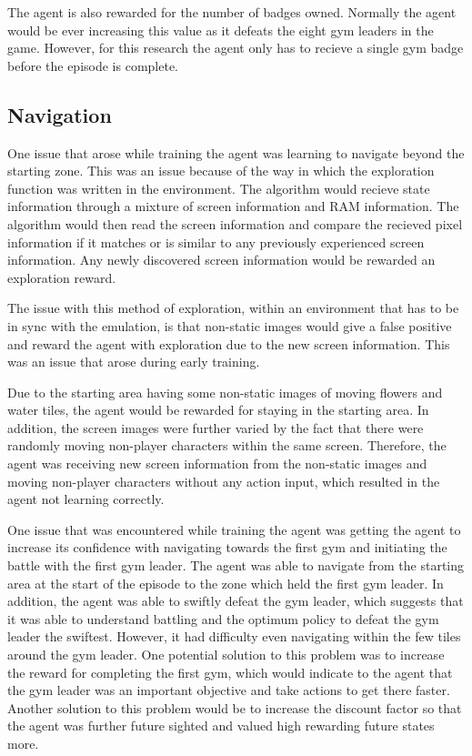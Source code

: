 The agent is also rewarded for the number of badges owned. Normally the agent would be ever increasing this value as it defeats the eight gym leaders in the game. However, for this research the agent only has to recieve a single gym badge before the episode is complete.

\subsection{Navigation}

One issue that arose while training the agent was learning to navigate beyond the starting zone. This was an issue because of the way in which the exploration function was written in the environment. The algorithm would recieve state information through a mixture of screen information and RAM information. The algorithm would then read the screen information and compare the recieved pixel information if it matches or is similar to any previously experienced screen information. Any newly discovered screen information would be rewarded an exploration reward. 

The issue with this method of exploration, within an environment that has to be in sync with the emulation, is that non-static images would give a false positive and reward the agent with exploration due to the new screen information. This was an issue that arose during early training. 

Due to the starting area having some non-static images of moving flowers and water tiles, the agent would be rewarded for staying in the starting area. In addition, the screen images were further varied by the fact that there were randomly moving non-player characters within the same screen. Therefore, the agent was receiving new screen information from the non-static images and moving non-player characters without any action input, which resulted in the agent not learning correctly.

One issue that was encountered while training the agent was getting the agent to increase its confidence with navigating towards the first gym and initiating the battle with the first gym leader. The agent was able to navigate from the starting area at the start of the episode to the zone which held the first gym leader. In addition, the agent was able to swiftly defeat the gym leader, which suggests that it was able to understand battling and the optimum policy to defeat the gym leader the swiftest. However, it had difficulty even navigating within the few tiles around the gym leader. One potential solution to this problem was to increase the reward for completing the first gym, which would indicate to the agent that the gym leader was an important objective and take actions to get there faster. Another solution to this problem would be to increase the discount factor so that the agent was further future sighted and valued high rewarding future states more. 

